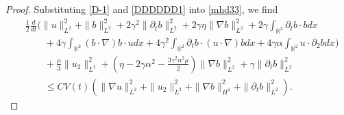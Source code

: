 \documentclass[10pt,a4paper]{amsart}
\def\R{\mathbb R}
\begin{document}
\begin{proof}
 Substituting \eqref{D-1} and \eqref{DDDDDD1} into \eqref{mhd33}, we find
\begin{align}\label{mhd333}
&\frac{1}{2}\frac{d}{dt}\Big(\|u\|^2_{L^2}+\|b\|^2_{L^2}+2\gamma^2\|\partial_tb\|^2_{L^2}+2\gamma\eta\|\nabla b\|^2_{L^2}+2\gamma\int_{\R^2}\partial_tb\cdot bdx\nonumber\\&\qquad+4\gamma\int_{\R^2}(b\cdot\nabla) b\cdot u dx+4\gamma^2\int_{\R^2}\partial_{t}b\cdot (u\cdot\nabla) bdx+4\gamma\alpha\int_{\R^2}u\cdot\partial_2 bdx
\Big)\nonumber\\
&\qquad+\frac{\mu}{3}\|u_2\|^2_{L^2}+(\eta-2\gamma\alpha^2-\frac{3\gamma^2\alpha^2\mu}{2})\|\nabla b\|^2_{L^2}+\gamma\|\partial_tb\|^2_{L^2}\nonumber\\
&\qquad\leq CV(t)\left(\|\nabla u\|_{L^{2}}^2+\|u_2\|_{L^2}^2+\|\nabla b\|_{H^1}^2+\|\partial_tb\|_{L^{2}}^2\right).
\end{align}










\end{proof}
\end{document}
